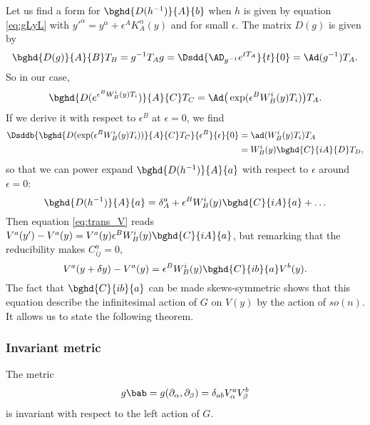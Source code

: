 Let us find a form for $\bghd{D(h^{-1})}{A}{b}$ when $h$ is given by equation \eqref{eq:gLyL} with ${y'}^{\alpha}=y^{\alpha}+\epsilon^A K_A^{\alpha}(y)$ and for small $\epsilon$. The matrix $D(g)$ is given by
\[
   \bghd{D(g)}{A}{B}T_B=g^{-1} T_A g=\Dsdd{\AD_{g^{-1}} e^{tT_A}}{t}{0}=\Ad(g^{-1})T_A.
\]
So in our case,
\begin{equation}
  \bghd{ D(e^{\epsilon^BW_B^i(y)T_i}) }{A}{C}T_C=\Ad\big(\exp(\epsilon^BW_B^i(y)T_i)\big)T_A.
\end{equation}
If we derive it with respect to $\epsilon^B$ at $\epsilon=0$, we find
\begin{equation}
\begin{split}  
    \Dsddb{  \bghd{D( \exp(\epsilon^BW_B^i(y)T_i)  )}{A}{C}T_C  }{\epsilon^B}{\epsilon}{0}
              &=\ad(W_B^i(y)T_i)T_A\\
              &=W_B^i(y)\bghd{C}{iA}{D}T_D,
\end{split}
\end{equation}
so that we can power expand $\bghd{D(h^{-1})}{A}{a}$ with respect to $\epsilon$ around $\epsilon=0$:
\begin{equation}\label{eq:Dinfin}
  \bghd{D(h^{-1})}{A}{a}=\delta^a_A+\epsilon^BW_B^i(y)\bghd{C}{iA}{a}+\ldots
\end{equation}
Then equation \eqref{eq:trans_V} reads $V^a(y')-V^a(y)=V^a(y)\epsilon^BW_B^i(y)\bghd{C}{iA}{a}$, but remarking that the reducibility makes $C_{ij}^a=0$,
\begin{equation}
 V^a(y+\delta y)-V^a(y)=\epsilon^BW_B^i(y)\bghd{C}{ib}{a}V^b(y).
\end{equation}
The fact that $\bghd{C}{ib}{a}$ can be made skews-symmetric shows that this equation describe the infinitesimal action of $G$ on $V(y)$ by the action of $so(n)$. It allows us to state the following theorem.


\subsubsection{Invariant metric}


\begin{theorem}
The metric
\begin{equation}\label{eq:metric_GH}
   g\bab=g(\partial_{\alpha},\partial_{\beta})=\delta_{ab}V_{\alpha}^aV_{\beta}^b
\end{equation}
is invariant with respect to the left action of $G$. 
\end{theorem}

